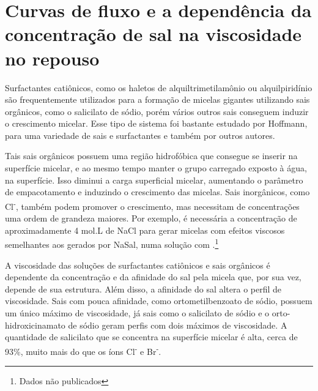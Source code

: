 		\section{Curvas de fluxo e a dependência da concentração de sal na viscosidade no repouso}    
			
		Surfactantes catiônicos, como os haletos de alquiltrimetilamônio ou alquilpiridínio são frequentemente utilizados para a formação de micelas gigantes utilizando sais orgânicos, como o salicilato de sódio, porém vários outros sais conseguem induzir o crescimento micelar. Esse tipo de sistema foi bastante estudado por Hoffmann, para uma variedade de sais e surfactantes\cite{Rehage1991, Rehage1988, Hoffmann1992a} e também por outros autores.\cite{Wei2013, Hartmann1998, Lutz-Bueno2016a,Lutz-Bueno2017, Cappelaere1998, Pleines2019, Clinckspoor2015, Raghavan2002a, Davies2006}
		
		Tais sais orgânicos possuem uma região hidrofóbica que consegue se inserir na superfície micelar, e ao mesmo tempo manter o grupo carregado exposto à água, na superfície. Isso diminui a carga superficial micelar, aumentando o parâmetro de empacotamento e induzindo o crescimento das micelas. Sais inorgânicos, como Cl\textsuperscript{-}, também podem promover o crescimento, mas necessitam de concentrações uma ordem de grandeza maiores. Por exemplo, é necessária a concentração de aproximadamente 4 mol.L\menosUm{} de NaCl para gerar micelas com efeitos viscosos semelhantes aos gerados por NaSal, numa solução com  \mM.\footnote{Dados não publicados}
		
		
		
		A viscosidade das soluções de surfactantes catiônicos e sais orgânicos é dependente da concentração e da afinidade do sal pela micela que, por sua vez, depende de sua estrutura. Além disso, a afinidade do sal altera o perfil de viscosidade. Sais com pouca afinidade, como ortometilbenzoato de sódio, possuem um único máximo de viscosidade, já sais como o salicilato de sódio e o orto-hidroxicinamato de sódio geram perfis com dois máximos de viscosidade.\cite{Clinckspoor2015, Ito2014c}
		A quantidade de salicilato que se concentra na superfície micelar é alta, cerca de 93\%, muito mais do que os íons Cl\textsuperscript{-} e Br\textsuperscript{-}.\cite{Rehage1991}
		
